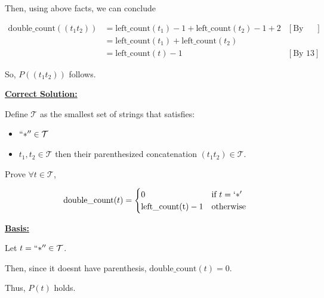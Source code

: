 \documentclass[12pt]{article}
\begin{document}
\begin{enumerate}[a.]
    Then, using above facts, we can conclude

    \begin{align}
        \text{double\_count}((t_1t_2)) &= \text{left\_count}(t_1) - 1 + \text{left\_count}(t_2) - 1 + 2 & [\text{By I.H}]\\
        &= \text{left\_count}(t_1) + \text{left\_count}(t_2)\\
        &= \text{left\_count}(t) - 1 & [\text{By 13}]
    \end{align}

    \bigskip

    So, $P((t_1t_2))$ follows.

    \bigskip

    \begin{mdframed}
        \underline{\textbf{Correct Solution:}}

        \bigskip

        Define $\mathcal{T}$ as the smallest set of strings that satisfies:

        \begin{itemize}
            \item $``*'' \in \mathcal{T}$
            \item $t_1, t_2 \in \mathcal{T}$ then their parenthesized concatenation $(t_1t_2) \in \mathcal{T}$.
        \end{itemize}

        \bigskip

        Prove $\forall t \in \mathcal{T}$,

        \begin{align*}
            \text{double\_count}(t) =
            \begin{cases}
            0 & \text{if $t = `*'$}\\
            \text{left\_count(t)} - 1 & \text{otherwise}
            \end{cases}
        \end{align*}

        \bigskip

        \underline{\textbf{Basis:}}

        \bigskip

        Let $t = ``*'' \in \mathcal{T}$.

        \bigskip

        Then, since it doesnt have parenthesis, $\text{double\_count}(t) = 0$.

        \bigskip

        Thus, $P(t)$ holds.


\end{mdframed}
\end{enumerate}
\end{document}
